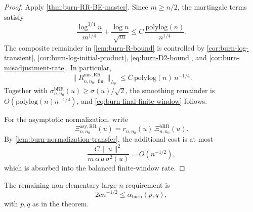 \begin{proof} Apply \cref{thm:burn-RR-BE-master}. Since $m \ge n / 2$, the martingale
terms satisfy
\[
\frac{\log^{3 / 4} n}{m^{1 / 4}}
  + \frac{\log n}{\sqrt{m}}
  \le C \, \frac{\mathrm{polylog}(n)}{n^{1 / 4}}.
\]
The composite remainder in \cref{lem:burn-R-bound} is controlled by
\cref{cor:burn-log-transient}, \cref{cor:burn-log-initial-product}, \eqref{eq:burn-D2-bound}, and
\cref{cor:burn-misadjustment-rate}. In particular,
\[
\lVert R_{n,n_{0}, \operatorname{fin}}^{\mathrm{mis,RR}} \rVert_{L_{p}}
  \le C \, \mathrm{polylog}(n) \, n^{-1 / 4}.
\]
Together with $\sigma_{n,n_{0}}^{\mathrm{bRR}}(u) \ge \sigma(u) / \sqrt{2}$, the
smoothing remainder is $O(\mathrm{polylog}(n) n^{-1 / 4})$, and
\eqref{eq:burn-final-finite-window} follows.

For the asymptotic normalization, write
\[
\Xi_{n,n_{0}}^{\mathrm{asy,RR}}(u)
  = r_{n,n_{0}}(u) \, \Xi_{n,n_{0}}^{\mathrm{bRR}}(u).
\]
By \cref{lem:burn-normalization-transfer}, the additional cost is at most
\[
\frac{C \, \lVert u \rVert^{2}}{m \, \alpha \, a \, \sigma^{2}(u)}
  = O(n^{-1 / 2}),
\]
which is absorbed into the balanced finite-window rate.
\end{proof}

The remaining non-elementary large-$n$ requirement is
\begin{equation}
2 c n^{-1 / 2}
  \le \alpha_{\mathrm{burn}}(p,q),
\label{eq:burn-final-levin-eventual}
\end{equation}
with $p,q$ as in the theorem.

